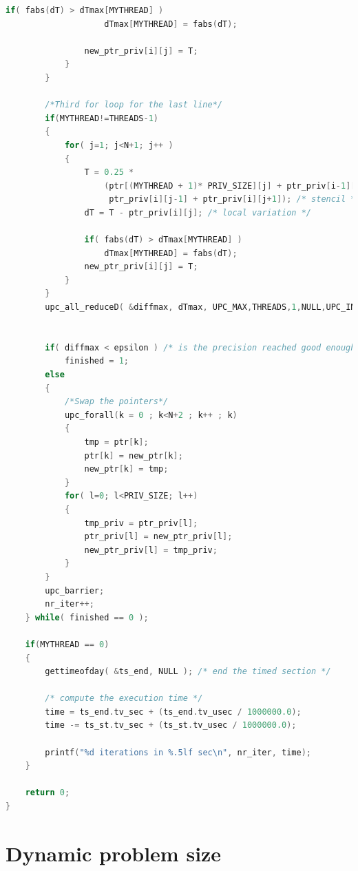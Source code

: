 \documentclass{report}
\begin{document}
\begin{lstlisting}[language=c]
                if( fabs(dT) > dTmax[MYTHREAD] )
                    dTmax[MYTHREAD] = fabs(dT);
    
                new_ptr_priv[i][j] = T;
            }
        }

        /*Third for loop for the last line*/
        if(MYTHREAD!=THREADS-1)
        {
            for( j=1; j<N+1; j++ )
            {
                T = 0.25 *
                    (ptr[(MYTHREAD + 1)* PRIV_SIZE][j] + ptr_priv[i-1][j] +
                     ptr_priv[i][j-1] + ptr_priv[i][j+1]); /* stencil */
                dT = T - ptr_priv[i][j]; /* local variation */

                if( fabs(dT) > dTmax[MYTHREAD] )
                    dTmax[MYTHREAD] = fabs(dT);
                new_ptr_priv[i][j] = T;
            }
        }
        upc_all_reduceD( &diffmax, dTmax, UPC_MAX,THREADS,1,NULL,UPC_IN_ALLSYNC | UPC_OUT_ALLSYNC);

        
        if( diffmax < epsilon ) /* is the precision reached good enough ? */
            finished = 1;
        else
        {
            /*Swap the pointers*/
            upc_forall(k = 0 ; k<N+2 ; k++ ; k)   
            {   
                tmp = ptr[k];
                ptr[k] = new_ptr[k];
                new_ptr[k] = tmp;  
            }
            for( l=0; l<PRIV_SIZE; l++)
            {
                tmp_priv = ptr_priv[l];
                ptr_priv[l] = new_ptr_priv[l];
                new_ptr_priv[l] = tmp_priv;
            }
        }
        upc_barrier;
        nr_iter++;
    } while( finished == 0 );

    if(MYTHREAD == 0)
    {
        gettimeofday( &ts_end, NULL ); /* end the timed section */

        /* compute the execution time */
        time = ts_end.tv_sec + (ts_end.tv_usec / 1000000.0);
        time -= ts_st.tv_sec + (ts_st.tv_usec / 1000000.0);

        printf("%d iterations in %.5lf sec\n", nr_iter, time);
    }
    
    return 0;
}
\end{lstlisting}

\section{Dynamic problem size}



\listoffigures
\end{document}
